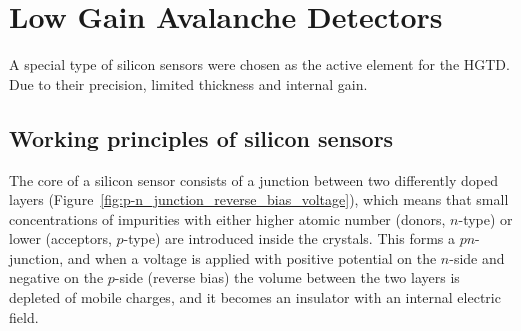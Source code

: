 \section{Low Gain Avalanche Detectors}\label{sec:LGADs}


A special type of silicon sensors were chosen as the active element for the HGTD. Due to their precision, limited thickness and internal gain.

\subsection{Working principles of silicon sensors}

The core of a silicon sensor consists of a junction between two differently doped layers (Figure~\ref{fig:p-n_junction_reverse_bias_voltage}), which means that small concentrations of impurities with either higher atomic number (donors, \(n\)-type) or lower (acceptors, \(p\)-type) are introduced inside the crystals.
This forms a \(pn\)-junction, and when a voltage is applied with positive potential on the \(n\)-side and negative on the \(p\)-side (reverse bias) the volume between the two layers is depleted of mobile charges, and it becomes an insulator with an internal electric field.


